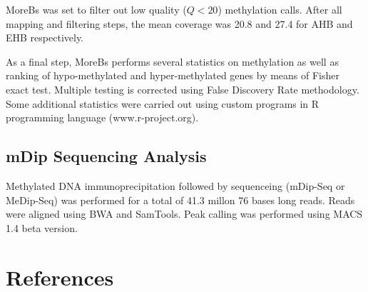 \documentclass[10pt,a4paper]{article}
\begin{document}
MoreBs was set to filter out low quality  ($Q < 20$) methylation calls. After all mapping and filtering steps, the mean coverage was 20.8 and 27.4 for AHB and EHB respectively.

As a final step, MoreBs performs several statistics on methylation as well as ranking of hypo-methylated and hyper-methylated genes by means of Fisher exact test. 
Multiple testing is corrected using False Discovery Rate methodology\cite{benjamini1995controlling}.
Some additional statistics were carried out using custom programs in R programming language (www.r-project.org).

\subsection{mDip Sequencing Analysis}
Methylated DNA immunoprecipitation followed by sequenceing (mDip-Seq or MeDip-Seq) was performed for a total of 41.3 millon 76 bases long reads.
Reads were aligned using BWA and SamTools.
Peak calling was performed using MACS \cite{zhang2008model} 1.4 beta version.



\section{References}


\end{document}
